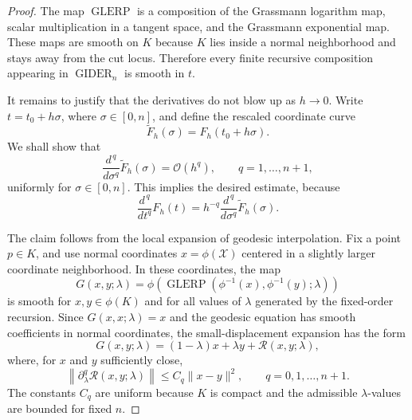 \documentclass[10pt,a4paper]{amsart}
\newcommand{\GIDER}{\operatorname{GIDER}}
\newcommand{\GLERP}{\operatorname{GLERP}}
\begin{document}
\begin{proof}
The map \(\GLERP\) is a composition of the Grassmann logarithm map, scalar multiplication in a tangent space, and the Grassmann exponential map.  These maps are smooth on \(K\) because \(K\) lies inside a normal neighborhood and stays away from the cut locus.  Therefore every finite recursive composition appearing in \(\GIDER_n\) is smooth in \(t\).

It remains to justify that the derivatives do not blow up as \(h\to0\).  Write \(t=t_0+h\sigma\), where \(\sigma\in[0,n]\), and define the rescaled coordinate curve
\[
    \widetilde F_h(\sigma)
    =
    F_h(t_0+h\sigma).
\]
We shall show that
\[
    \frac{d^{\,q}}{d\sigma^{q}}\widetilde F_h(\sigma)
    =
    \mathcal{O}(h^q),
    \qquad q=1,\ldots,n+1,
\]
uniformly for \(\sigma\in[0,n]\).  This implies the desired estimate, because
\[
    \frac{d^{\,q}}{dt^q}F_h(t)
    =
    h^{-q}
    \frac{d^{\,q}}{d\sigma^q}\widetilde F_h(\sigma).
\]

The claim follows from the local expansion of geodesic interpolation.  Fix a point \(p\in K\), and use normal coordinates \(x=\phi(\mathcal{X})\) centered in a slightly larger coordinate neighborhood.  In these coordinates, the map
\[
    G(x,y;\lambda)
    =
    \phi\left(
        \GLERP(\phi^{-1}(x),\phi^{-1}(y);\lambda)
    \right)
\]
is smooth for \(x,y\in\phi(K)\) and for all values of \(\lambda\) generated by the fixed-order recursion.  Since \(G(x,x;\lambda)=x\) and the geodesic equation has smooth coefficients in normal coordinates, the small-displacement expansion has the form
\[
    G(x,y;\lambda)
    =
    (1-\lambda)x+\lambda y
    +
    \mathcal{R}(x,y;\lambda),
\]
where, for \(x\) and \(y\) sufficiently close,
\[
    \left\|\partial_\lambda^q \mathcal{R}(x,y;\lambda)\right\|
    \le
    C_q\|x-y\|^2,
    \qquad q=0,1,\ldots,n+1.
\]
The constants \(C_q\) are uniform because \(K\) is compact and the admissible \(\lambda\)-values are bounded for fixed \(n\).


\end{proof}
\end{document}
